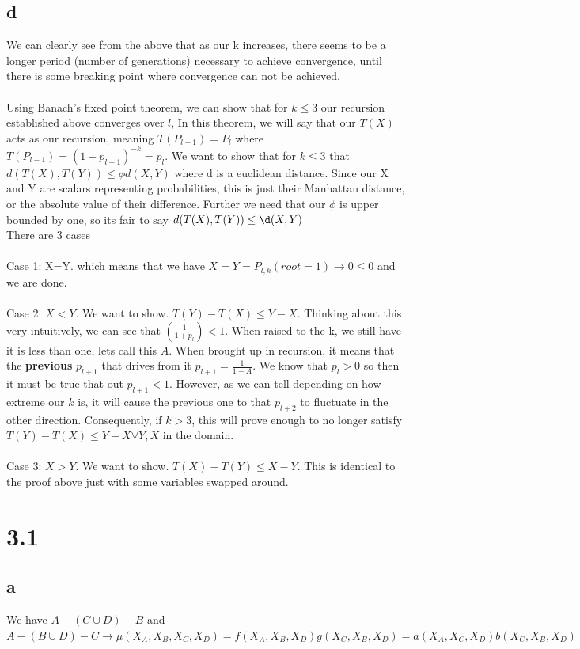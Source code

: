 \documentclass[12pt]{article}
\begin{document}
\subsection{d}
We can clearly see from the above that as our k increases, there seems to be a longer period (number of generations) necessary to achieve convergence, until there is some breaking point where convergence can not be achieved.
\\
\\ 
Using Banach's fixed point theorem, we can show that for $k\le 3$ our recursion established above converges over $l$, In this theorem, we will say that our $T(X)$ acts as our recursion, meaning $T(P_{l-1}) = P_l$ where $T(P_{l-1}) = (1-p_{l-1})^{-k} = p_l$. We want to show that for $k\le 3$ that $d(T(X),T(Y)) \le \phi d(X,Y)$ where d is a euclidean distance. Since our X and Y are scalars representing probabilities, this is just their Manhattan distance, or the absolute value of their difference. Further we need that our $\phi$ is upper bounded by one, so its fair to say $d(T(X),T(Y)) \le \d(X,Y)$ 
\\
There are 3 cases
\\
\\
Case 1: X=Y. which means that we have $X=Y=P_{l,k}(root = 1) \rightarrow 0 \le 0$ and we are done.
\\
\\
Case 2: $X<Y$. We want to show. $T(Y)-T(X) \le Y-X$. Thinking about this very intuitively, we can see that $(\frac{1}{1+p_{l}}) < 1$. When raised to the k, we still have it is less than one, lets call this $A$. When brought up in recursion, it means that the \textbf{previous} $p_{l+1}$ that drives from it $p_{l+1} = \frac{1}{1+A}$. We know that $p_l >0$ so then it must be true that out $p_{l+1} < 1$. However, as we can tell depending on how extreme our $k$ is, it will cause the previous one to that $p_{l+2}$ to fluctuate in the other direction. Consequently, if $k>3$, this will prove enough to no longer satisfy $T(Y)-T(X) \le Y-X \forall Y,X$ in the domain.
\\
\\
Case 3: $X>Y$. We want to show. $T(X)-T(Y) \le X-Y$. This is identical to the proof above just with some variables swapped around.

\section{3.1}

\subsection{a}
We have $A-(C\cup D)-B$ and $A-(B\cup D)-C \rightarrow \mu(X_A,X_B,X_C,X_D) = f(X_A,X_B,X_D)g(X_C,X_B,X_D) = a(X_A,X_C,X_D)b(X_C,X_B,X_D)$
\end{document}
